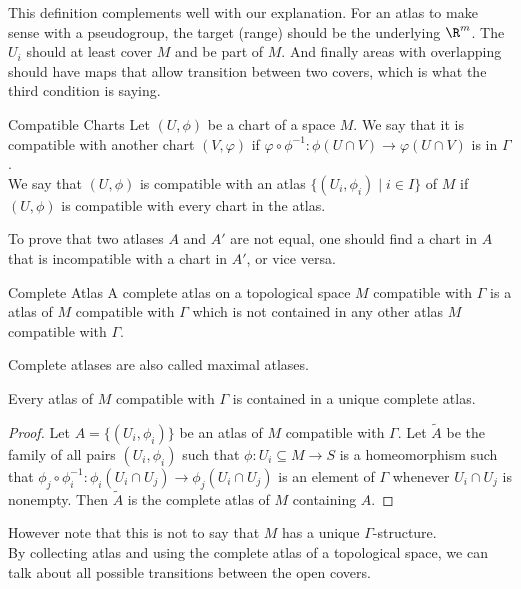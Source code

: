 \documentclass[a4paper]{article}
\begin{document}
This definition complements well with our explanation. For an atlas to make sense with a pseudogroup, the target (range) should be the underlying $\R^m$. The $U_i$ should at least cover $M$ and be part of $M$. And finally areas with overlapping should have maps that allow transition between two covers, which is what the third condition is saying. 

\begin{defn}{Compatible Charts}{} Let $(U,\phi)$ be a chart of a space $M$. We say that it is compatible with another chart $(V,\varphi)$ if $\varphi\circ\phi^{-1}:\phi(U\cap V)\to\varphi(U\cap V)$ is in $\Gamma$. \\
We say that $(U,\phi)$ is compatible with an atlas $\{(U_i,\phi_i)\;|\;i\in I\}$ of $M$ if $(U,\phi)$ is compatible with every chart in the atlas. 
\end{defn}

To prove that two atlases $A$ and $A'$ are not equal, one should find a chart in $A$ that is incompatible with a chart in $A'$, or vice versa. 

\begin{defn}{Complete Atlas}{} A complete atlas on a topological space $M$ compatible with $\Gamma$ is a atlas of $M$ compatible with $\Gamma$ which is not contained in any other atlas $M$ compatible with $\Gamma$. 
\end{defn}

Complete atlases are also called maximal atlases. 

\begin{lmm}{}{} Every atlas of $M$ compatible with $\Gamma$ is contained in a unique complete atlas. 
\begin{proof}
Let $A=\{(U_i,\phi_i)\}$ be an atlas of $M$ compatible with $\Gamma$. Let $\tilde{A}$ be the family of all pairs $(U_i,\phi_i)$ such that $\phi:U_i\subseteq M\to S$ is a homeomorphism such that $\phi_j\circ\phi_i^{-1}:\phi_i(U_i\cap U_j)\to\phi_j(U_i\cap U_j)$ is an element of $\Gamma$ whenever $U_i\cap U_j$ is nonempty. Then $\tilde{A}$ is the complete atlas of $M$ containing $A$. 
\end{proof}
\end{lmm}

However note that this is not to say that $M$ has a unique $\Gamma$-structure. \\

By collecting atlas and using the complete atlas of a topological space, we can talk about all possible transitions between the open covers. 
\end{document}
